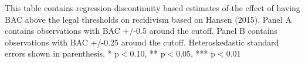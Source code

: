 \begin{table}[htbp]
\begin{center}
\begin{threeparttable}
\begin{tabular}{l*{6}{c}}
\end{tabular}
\begin{tablenotes}
\tiny
\item This table contains regression discontinuity based estimates of the effect of having BAC above the legal thresholds on recidivism based on Hansen (2015). Panel A contains observations with BAC +/-0.5 around the cutoff. Panel B contains observations with BAC +/-0.25 around the cutoff. Heteroskedastic standard errors shown in parenthesis.  * p$<$0.10, ** p$<$0.05, *** p$<$0.01
\end{tablenotes}
\end{threeparttable}
\end{center}
\end{table}


